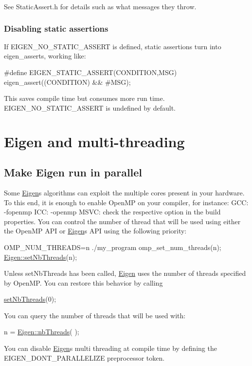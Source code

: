 See Static\+Assert.\+h for details such as what messages they throw.\hypertarget{_topic_assertions_DisableStaticAssert}{}\subsubsection{Disabling static assertions}\label{_topic_assertions_DisableStaticAssert}
If {\ttfamily E\+I\+G\+E\+N\+\_\+\+N\+O\+\_\+\+S\+T\+A\+T\+I\+C\+\_\+\+A\+S\+S\+E\+RT} is defined, static assertions turn into {\ttfamily eigen\+\_\+assert}\textquotesingle{}s, working like\+:


\begin{DoxyCode}
\textcolor{preprocessor}{#define EIGEN\_STATIC\_ASSERT(CONDITION,MSG) eigen\_assert((CONDITION) && #MSG);}
\end{DoxyCode}


This saves compile time but consumes more run time. {\ttfamily E\+I\+G\+E\+N\+\_\+\+N\+O\+\_\+\+S\+T\+A\+T\+I\+C\+\_\+\+A\+S\+S\+E\+RT} is undefined by default. \hypertarget{TopicMultiThreading}{}\section{Eigen and multi-\/threading}\label{TopicMultiThreading}
\hypertarget{_topic_multi_threading_TopicMultiThreading_MakingEigenMT}{}\subsection{Make Eigen run in parallel}\label{_topic_multi_threading_TopicMultiThreading_MakingEigenMT}
Some \hyperlink{namespace_eigen}{Eigen}\textquotesingle{}s algorithms can exploit the multiple cores present in your hardware. To this end, it is enough to enable Open\+MP on your compiler, for instance\+: G\+CC\+: {\ttfamily -\/fopenmp} I\+CC\+: {\ttfamily -\/openmp} M\+S\+VC\+: check the respective option in the build properties. You can control the number of thread that will be used using either the Open\+MP A\+PI or \hyperlink{namespace_eigen}{Eigen}\textquotesingle{}s A\+PI using the following priority\+: 
\begin{DoxyCode}
OMP\_NUM\_THREADS=n ./my\_program
omp\_set\_num\_threads(n);
\hyperlink{namespace_eigen_af9cd17c2fe18204239cd11c88c120b50}{Eigen::setNbThreads}(n);
\end{DoxyCode}
 Unless set\+Nb\+Threads has been called, \hyperlink{namespace_eigen}{Eigen} uses the number of threads specified by Open\+MP. You can restore this behavior by calling
\begin{DoxyCode}
\hyperlink{namespace_eigen_af9cd17c2fe18204239cd11c88c120b50}{setNbThreads}(0); 
\end{DoxyCode}
 You can query the number of threads that will be used with\+: 
\begin{DoxyCode}
n = \hyperlink{namespace_eigen_a9aca97d83e21b91a04ec079360dfffeb}{Eigen::nbThreads}( );
\end{DoxyCode}
 You can disable \hyperlink{namespace_eigen}{Eigen}\textquotesingle{}s multi threading at compile time by defining the E\+I\+G\+E\+N\+\_\+\+D\+O\+N\+T\+\_\+\+P\+A\+R\+A\+L\+L\+E\+L\+I\+ZE preprocessor token.

